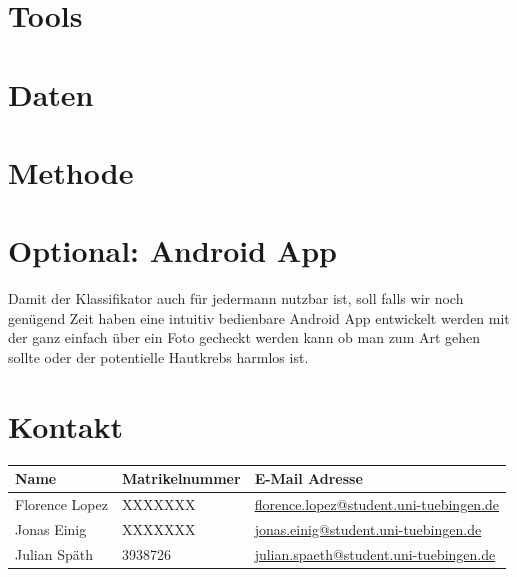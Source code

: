 \documentclass[%
   10pt,              %
   a4paper,           %
   DIV10,             %
]{scrartcl}%
\begin{document}
\section*{Tools}

\section*{Daten}

\section*{Methode}

\section*{Optional: Android App}
Damit der Klassifikator auch für jedermann nutzbar ist, soll falls wir noch genügend Zeit haben eine intuitiv bedienbare Android App entwickelt werden mit der ganz einfach über ein Foto gecheckt werden kann ob man zum Art gehen sollte oder der potentielle Hautkrebs harmlos ist.

\section*{Kontakt}
\centering
\begin{tabular}{lll}
\toprule
Name & Matrikelnummer & E-Mail Adresse \\
\midrule
Florence Lopez & XXXXXXX  &  \href{mailto:florence.lopez@student.uni-tuebingen.de}{florence.lopez@student.uni-tuebingen.de} \\
Jonas Einig  & XXXXXXX    & \href{mailto:jonas.einig@student.uni-tuebingen.de}{jonas.einig@student.uni-tuebingen.de}    \\
Julian Späth  & 3938726    & \href{mailto:julian.spaeth@student.uni-tuebingen.de}{julian.spaeth@student.uni-tuebingen.de}    \\
\bottomrule
\end{tabular}



\end{document}
